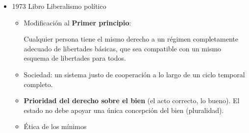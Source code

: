 \documentclass[
  letterpaper,
  DIV=11,
  numbers=noendperiod]{scrreprt}
\begin{document}
\begin{itemize}
\begin{itemize}
    \textbf{Libertades} básicas (\textbf{negativas}): Libertad política,
    libertad de discurso, libertad de reunión libertad de conciencia y
    de pensamiento, libertad personal junto con el derecho a la
    propiedad personal y libertad respecto a la detención y arresto
    arbitrario.

    \textbf{Democracia} constitucional
  \item
    Autorealización: uno de los bienes más importantes que un individuo
    puede disfrutar. La igualdad de oportunidades significa tener las
    mismas perspectivas de éxito independientemente de su posición
    inicial en la clase social. Hayeck mencionaba que esto no se podía
    lograr porque lo que se premia son los logros no los méritos.
  \item
    Prioridad de las necesidades materiales básicas:

    \begin{itemize}
    \item
      Deben estar cubiertas para todos
    \item
      Cualquier persona tiene igual derecho a un esquema plenamente
      similar de libertades para todos.
    \item
      Las oportunidades para lograr las posiciones sociales deseadas
      deben ser distribuidas por el sistema social de tal modo que logre
      maximizar las oportunidades de las clases más desfavorecidas.
    \item
      La \textbf{desigualdad económica} debe ser acordada de tal modo
      que logre maximizar la riqueza de la clase mas pobre.
    \item
      \textbf{Estado de bienestar}

      Es obligación del gobierno garantizar un mínimo social a cargo de
      mecanismos como la libre escolarización para todos, o bien a
      través de la enseñanza pública o subvencionando a las escuelas
      privadas.
    \item
      Ventajas de nacimiento: naturales (dotados), familia con riqueza,
      suerte.
    \end{itemize}
  \end{itemize}
\item
  1973 Libro Liberalismo político

  \begin{itemize}
  \item
    Modificación al \textbf{Primer principio}:

    Cualquier persona tiene el mismo derecho a un régimen completamente
    adecuado de libertades básicas, que sea compatible con un mismo
    esquema de libertades para todos.
  \item
    Sociedad: un sistema justo de cooperación a lo largo de un ciclo
    temporal completo.
  \item
    \textbf{Prioridad del derecho sobre el bien} (el acto correcto, lo
    bueno). El estado no debe apoyar una única concepción del bien
    (pluralidad).
  \item
    Ética de los mínimos
  \end{itemize}
\end{itemize}
\end{document}
